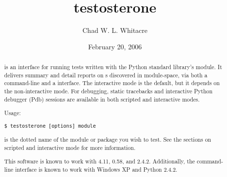 \documentclass{manual}
\title{testosterone}
\author{Chad W. L. Whitacre}
\date{February 20, 2006}		%
\begin{document}
\maketitle

\begin{abstract}

\noindent

 is an interface for running tests written with the Python
standard library's  module. It delivers summary and detail
reports on s discovered in module-space, via both a command-line
and a  interface. The interactive mode is the default, but it
depends on the non-interactive mode. For debugging, static tracebacks and
interactive Python debugger (Pdb) sessions are available in both scripted and
interactive modes.

Usage:

\begin{verbatim}
$ testosterone [options] module
\end{verbatim}

 is the dotted name of the module or package you wish to test. See
the sections on scripted and interactive mode for more information.

This software is known to work with 
4.11,  0.58,
and  2.4.2. Additionally, the command-line
interface is known to work with Windows XP and Python 2.4.2.


\end{abstract}




\end{document}
